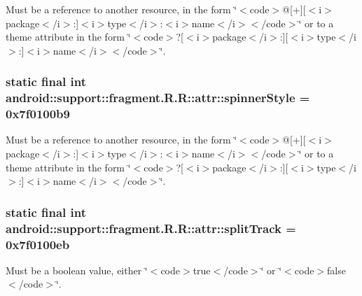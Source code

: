 Must be a reference to another resource, in the form \char`\"{}$<$code$>$@\mbox{[}+\mbox{]}\mbox{[}$<$i$>$package$<$/i$>$:\mbox{]}$<$i$>$type$<$/i$>$:$<$i$>$name$<$/i$>$$<$/code$>$\char`\"{} or to a theme attribute in the form \char`\"{}$<$code$>$?\mbox{[}$<$i$>$package$<$/i$>$:\mbox{]}\mbox{[}$<$i$>$type$<$/i$>$:\mbox{]}$<$i$>$name$<$/i$>$$<$/code$>$\char`\"{}. \hypertarget{classandroid_1_1support_1_1fragment_1_1_r_1_1attr_d0051edef4d77a321f7c1c0f68d33ea2}{
\subsubsection[{spinnerStyle}]{\setlength{\rightskip}{0pt plus 5cm}static final int android::support::fragment.R.R::attr::spinnerStyle = 0x7f0100b9}}
\label{classandroid_1_1support_1_1fragment_1_1_r_1_1attr_d0051edef4d77a321f7c1c0f68d33ea2}


Must be a reference to another resource, in the form \char`\"{}$<$code$>$@\mbox{[}+\mbox{]}\mbox{[}$<$i$>$package$<$/i$>$:\mbox{]}$<$i$>$type$<$/i$>$:$<$i$>$name$<$/i$>$$<$/code$>$\char`\"{} or to a theme attribute in the form \char`\"{}$<$code$>$?\mbox{[}$<$i$>$package$<$/i$>$:\mbox{]}\mbox{[}$<$i$>$type$<$/i$>$:\mbox{]}$<$i$>$name$<$/i$>$$<$/code$>$\char`\"{}. \hypertarget{classandroid_1_1support_1_1fragment_1_1_r_1_1attr_b099cfab4b77e91a088be7eaf635ebf5}{
\subsubsection[{splitTrack}]{\setlength{\rightskip}{0pt plus 5cm}static final int android::support::fragment.R.R::attr::splitTrack = 0x7f0100eb}}
\label{classandroid_1_1support_1_1fragment_1_1_r_1_1attr_b099cfab4b77e91a088be7eaf635ebf5}


Must be a boolean value, either \char`\"{}$<$code$>$true$<$/code$>$\char`\"{} or \char`\"{}$<$code$>$false$<$/code$>$\char`\"{}. 

